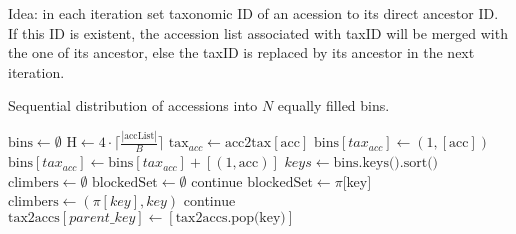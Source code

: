 \documentclass[a4paper]{scrartcl}
\begin{document}
Idea: in each iteration set taxonomic ID of an acession to its direct ancestor ID.
If this ID is existent, the accession list associated with taxID will be merged
with the one of its ancestor, else the taxID is replaced by its ancestor in the next iteration.


\begin{algorithm}
\caption{Sequential distribution of accessions into $N$ equally filled bins.}
\begin{algorithmic}[1]
\State $\textrm{bins} \gets \emptyset$
\State $\textrm{H}\gets 4\cdot \lceil\frac{|\textrm{accList}|}{B}\rceil$
    \State $\textrm{tax}_{acc} \gets \textrm{acc2tax}[\textrm{acc}]$
        \State $\textrm{bins}[tax_{acc}] \gets (1, [\textrm{acc}])$
    \Else
        \State $\textrm{bins}[tax_{acc}]\gets \textrm{bins}[tax_{acc}] + [(1, \textrm{acc})]$
     \EndIf
\EndFor
{}
  \State $keys \gets \textrm{bins.keys().sort()}$
  \State $\textrm{climbers} \gets \emptyset$
  \State $\textrm{blockedSet}\gets \emptyset$
      \State continue
    \EndIf
      \State $\textrm{blockedSet}\gets \pi[$key$]$
    \EndIf
    \State $\textrm{climbers} \gets (\pi[key], key)$
  \EndFor
        \State continue
    \EndIf
    \State $\textrm{tax2accs}[parent\_key] \gets [\textrm{tax2accs.pop(key)}]$
  \EndFor
\EndWhile
{}
\EndProcedure
\end{algorithmic}
\end{algorithm}
\end{document}
